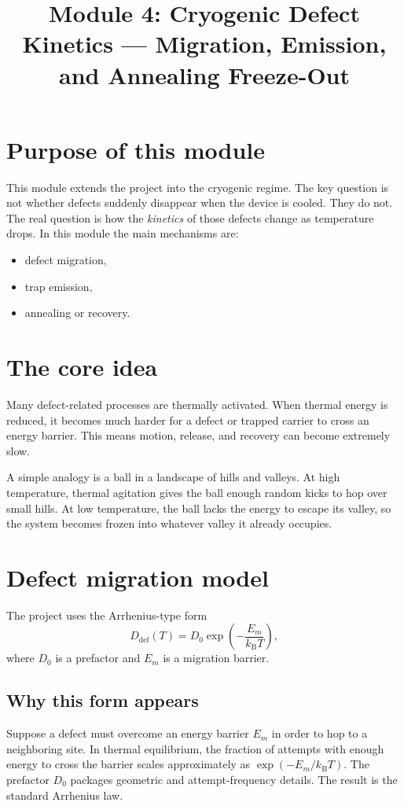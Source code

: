 \documentclass[11pt]{article}
\newcommand{\kb}{k_\mathrm{B}}
\begin{document}
\title{Module 4: Cryogenic Defect Kinetics --- Migration, Emission, and Annealing Freeze-Out}
\author{}
\date{}
\maketitle

\section{Purpose of this module}
This module extends the project into the cryogenic regime. The key question is not whether defects suddenly disappear when the device is cooled. They do not. The real question is how the \emph{kinetics} of those defects change as temperature drops. In this module the main mechanisms are:
\begin{itemize}
    \item defect migration,
    \item trap emission,
    \item annealing or recovery.
\end{itemize}

\section{The core idea}
Many defect-related processes are thermally activated. When thermal energy is reduced, it becomes much harder for a defect or trapped carrier to cross an energy barrier. This means motion, release, and recovery can become extremely slow.

A simple analogy is a ball in a landscape of hills and valleys. At high temperature, thermal agitation gives the ball enough random kicks to hop over small hills. At low temperature, the ball lacks the energy to escape its valley, so the system becomes frozen into whatever valley it already occupies.

\section{Defect migration model}
The project uses the Arrhenius-type form
\begin{equation}
D_{\mathrm{def}}(T) = D_0 \exp\!\left(-\frac{E_m}{\kb T}\right),
\end{equation}
where $D_0$ is a prefactor and $E_m$ is a migration barrier.

\subsection{Why this form appears}
Suppose a defect must overcome an energy barrier $E_m$ in order to hop to a neighboring site. In thermal equilibrium, the fraction of attempts with enough energy to cross the barrier scales approximately as $\exp(-E_m/\kb T)$. The prefactor $D_0$ packages geometric and attempt-frequency details. The result is the standard Arrhenius law.
\end{document}
